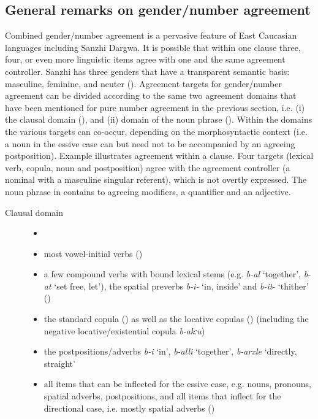 \subsection{General remarks on gender/number agreement}
\label{General remarks on gender/number agreement} 
Combined gender/number agreement is a pervasive feature of East Caucasian languages including Sanzhi Dargwa. It is possible that within one clause three, four, or even more linguistic items agree with one and the same agreement controller. Sanzhi has three genders that have a transparent semantic basis: masculine, feminine, and neuter (). Agreement targets for gender/number agreement can be divided according to the same two agreement domains that have been mentioned for pure number agreement in the previous section, i.e. (i) the clausal domain (), and (ii) domain of the noun phrase (). Within the domains the various targets can co-occur, depending on the morphosyntactic context (i.e. a noun in the essive case can but need not to be accompanied by an agreeing postposition). Example  illustrates agreement within a clause. Four targets (lexical verb, copula, noun and postposition) agree with the agreement controller (a nominal with a masculine singular referent), which is not overtly expressed. The noun phrase in  contains to agreeing modifiers, a quantifier and an adjective.


\begin{description}
\item[Clausal domain]
\begin{itemize}[leftmargin=*]
    \item[]
	\item	most vowel-initial verbs ()
	\item a few compound verbs with bound lexical stems (e.g. \textit{b-al} ‘together', \textit{b-at} ‘set free, let'), the spatial preverbs \textit{b-i-} `in, inside' and \textit{b-it}- ‘thither' ()
	\item the standard copula () as well as the locative copulas () (including the negative locative/existential copula \textit{b-akːu})
	\item the postpositions/adverbs \textit{b-i} ‘in', \textit{b-alli} ‘together', \textit{b-arxle} ‘directly, straight'
	\item	all items that can be inflected for the essive case, e.g. nouns, pronouns, spatial adverbs, postpositions, and all items that inflect for the directional case, i.e. mostly spatial adverbs ()
\end{itemize}
\end{description}

